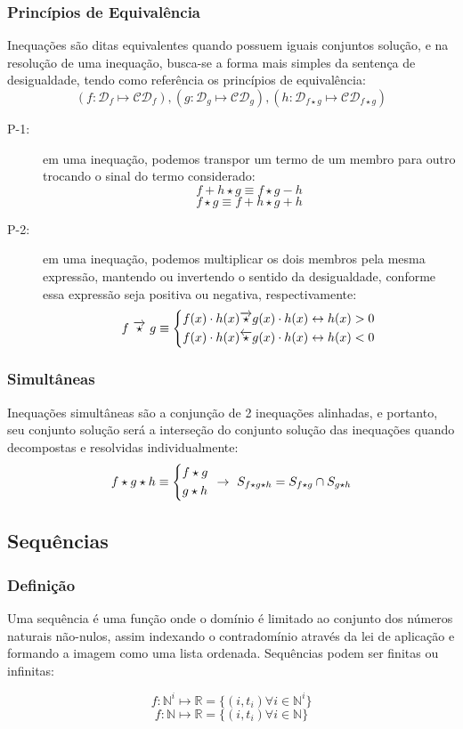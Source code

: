     \subsubsection{Princípios de Equivalência}
        Inequações são ditas equivalentes quando possuem iguais conjuntos solução, e na resolução de uma inequação, busca-se a forma mais simples da sentença de desigualdade, tendo como referência os princípios de equivalência:
        \[ (f: \mathcal{D}_f \mapsto \mathcal{CD}_f), (g: \mathcal{D}_g \mapsto \mathcal{CD}_g), (h: \mathcal{D}_{f \star g} \mapsto \mathcal{CD}_{f \star g}) \]
        \begin{description}
            \item[P-1:] em uma inequação, podemos transpor um termo de um membro para outro trocando o sinal do termo considerado:
            \[ f + h \star g \equiv f \star g - h \]
            \[ f \star g \equiv f + h \star g + h \]
            \item[P-2:] em uma inequação, podemos multiplicar os dois membros pela mesma expressão, mantendo ou invertendo o sentido da desigualdade, conforme essa expressão seja positiva ou negativa, respectivamente:
            \[ f \ \overrightarrow{\star} \ g  \equiv \begin{dcases} f(x) \cdot h(x) \overrightarrow{\star} g(x) \cdot h(x) \leftrightarrow h(x) > 0 \\ f(x) \cdot h(x) \overleftarrow{\star} g(x) \cdot h(x) \leftrightarrow h(x) < 0 \end{dcases} \]
        \end{description}
    \subsubsection{Simultâneas}
        Inequações simultâneas são a conjunção de 2 inequações alinhadas, e portanto, seu conjunto solução será a interseção do conjunto solução das inequações quando decompostas e resolvidas individualmente:
        \[ f \star g \star h \equiv \begin{dcases} f \star g \\ g \star h \end{dcases} \ \rightarrow \ S_{f \star g \star h} = S_{f \star g} \cap S_{g \star h} \]
\subsection{Sequências}
    \subsubsection{Definição}
        Uma sequência é uma função onde o domínio é limitado ao conjunto dos números naturais não-nulos, assim indexando o contradomínio através da lei de aplicação e formando a imagem como uma lista ordenada. Sequências podem ser finitas ou infinitas:
        \begin{multicols}{2}
            \noindent\[ f:\mathbb{N}^i \mapsto \mathbb{R} = \{ (i, t_i) \forall i \in \mathbb{N}^i \} \]
            \[ f:\mathbb{N} \mapsto \mathbb{R} = \{ (i, t_i) \forall i \in \mathbb{N} \} \]
        \end{multicols}
